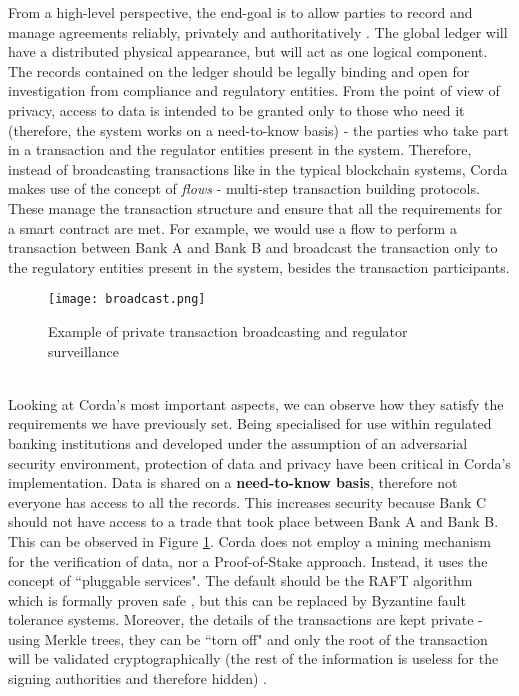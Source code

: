 \documentclass[12pt,twoside]{article}
\begin{document}
From a high-level perspective, the end-goal is to allow parties to record and manage agreements reliably, privately and authoritatively \cite{Corda:IP}. The global ledger will have a distributed physical appearance, but will act as one logical component. The records contained on the ledger should be legally binding and open for investigation from compliance and regulatory entities. From the point of view of privacy, access to data is intended to be granted only to those who need it (therefore, the system works on a need-to-know basis) - the parties who take part in a transaction and the regulator entities present in the system. Therefore, instead of broadcasting transactions like in the typical blockchain systems, Corda makes use of the concept of \textit{flows} - multi-step transaction building protocols. These manage the transaction structure and ensure that all the requirements for a smart contract are met. For example, we would use a flow to perform a transaction between Bank A and Bank B and broadcast the transaction only to the regulatory entities present in the system, besides the transaction participants.
\\
\begin{figure}[!htb]
\centering
\texttt{[image: broadcast.png]}
\caption{Example of private transaction broadcasting and regulator surveillance}
\centering
\label{fig:broadcast}
\end{figure}
\\
Looking at Corda's most important aspects, we can observe how they satisfy the requirements we have previously set. Being specialised for use within regulated banking institutions and developed under the assumption of an adversarial security environment, protection of data and privacy have been critical in Corda's implementation. Data is shared on a \textbf{need-to-know basis}, therefore not everyone has access to all the records. This increases security because Bank C should not have access to a trade that took place between Bank A and Bank B. This can be observed in Figure \ref{fig:broadcast}. Corda does not employ a mining mechanism for the verification of data, nor a Proof-of-Stake approach. Instead, it uses the concept of ``pluggable services". The default should be the RAFT algorithm which is formally proven safe \cite{raft}, but this can be replaced by Byzantine fault tolerance systems. Moreover, the details of the transactions are kept private - using Merkle trees, they can be ``torn off" and only the root of the transaction will be validated cryptographically (the rest of the information is useless for the signing authorities and therefore hidden) \cite{Corda:TP}. 
\end{document}
